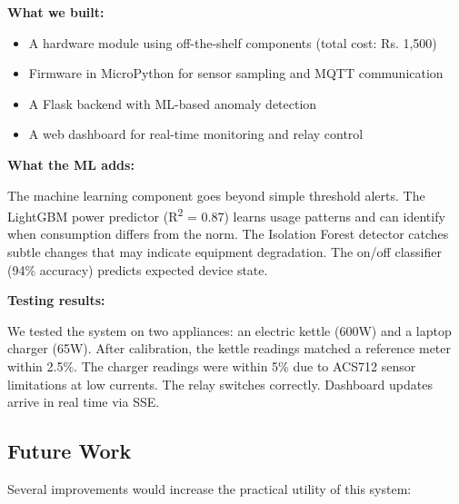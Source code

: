 \documentclass[12pt, a4paper]{article}
\begin{document}
	\textbf{What we built:}
	\begin{itemize}[itemsep=3pt, topsep=4pt]
		\item A hardware module using off-the-shelf components (total cost: Rs. 1,500)
		\item Firmware in MicroPython for sensor sampling and MQTT communication
		\item A Flask backend with ML-based anomaly detection
		\item A web dashboard for real-time monitoring and relay control
	\end{itemize}
	
	\textbf{What the ML adds:}
	
	The machine learning component goes beyond simple threshold alerts. The LightGBM power predictor (R\textsuperscript{2} = 0.87) learns usage patterns and can identify when consumption differs from the norm. The Isolation Forest detector catches subtle changes that may indicate equipment degradation. The on/off classifier (94\% accuracy) predicts expected device state.
	
	\textbf{Testing results:}
	
	We tested the system on two appliances: an electric kettle (600W) and a laptop charger (65W). After calibration, the kettle readings matched a reference meter within 2.5\%. The charger readings were within 5\% due to ACS712 sensor limitations at low currents. The relay switches correctly. Dashboard updates arrive in real time via SSE.
	
	\newpage
	\subsection{Future Work}
	
	Several improvements would increase the practical utility of this system:
	
\end{document}
